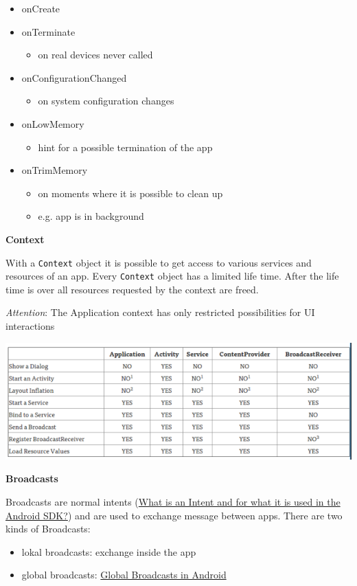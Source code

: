 \documentclass[11pt,twoside,landscape]{article}
\begin{document}
\begin{multicols}{3}
\begin{itemize}
\item onCreate
\item onTerminate
\begin{itemize}
\item on real devices never called
\end{itemize}
\item onConfigurationChanged
\begin{itemize}
\item on system configuration changes
\end{itemize}
\item onLowMemory
\begin{itemize}
\item hint for a possible termination of the app
\end{itemize}
\item onTrimMemory
\begin{itemize}
\item on moments where it is possible to clean up
\item e.g. app is in background
\end{itemize}
\end{itemize}


\textbf{Context}

With a \texttt{Context} object it is possible to get access to various services and resources of an app.
Every \texttt{Context} object has a limited life time.
After the life time is over all resources requested by the context are freed. 


\emph{Attention}: The Application context has only restricted possibilities for UI interactions 
\begin{center}
\includegraphics[width=.9\linewidth]{img/context_and_their_possibilities.png}
\end{center}


\textbf{Broadcasts}

Broadcasts are normal intents (\href{../../../roam/20211002175222-what_is_an_intent_and_for_what_it_is_used_in_the_android_sdk.org}{What is an Intent and for what it is used in the Android SDK?}) and are used to exchange message between apps.
There are two kinds of Broadcasts:
\begin{itemize}
\item lokal broadcasts: exchange inside the app
\item global broadcasts: \href{../../../roam/20211103165118-global_broadcasts_in_android.org}{Global Broadcasts in Android}
\end{itemize}


\end{multicols}
\end{document}
